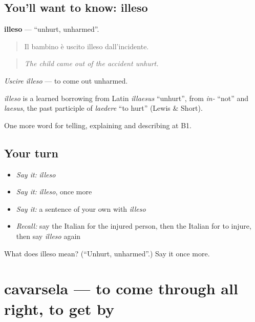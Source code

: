 \subsection*{You'll want to know: illeso}
\textbf{illeso} — \textquotedblleft{}unhurt, unharmed\textquotedblright{}.

\begin{quote}
Il bambino è uscito illeso dall'incidente.
\end{quote}

\begin{quote}
\emph{The child came out of the accident unhurt.}
\end{quote}

\emph{Uscire illeso} — to come out unharmed.

\begin{cousinweb}
\emph{illeso} is a learned borrowing from Latin \emph{illaesus} \textquotedblleft{}unhurt\textquotedblright{}, from \emph{in-} \textquotedblleft{}not\textquotedblright{} and \emph{laesus}, the past participle of \emph{laedere} \textquotedblleft{}to hurt\textquotedblright{} (Lewis \& Short).
\end{cousinweb}

\begin{grammarlens}[title={What you've built}]
One more word for telling, explaining and describing at B1.
\end{grammarlens}

\subsection*{Your turn}
\begin{itemize}
\raggedright
  \item \emph{Say it:} \emph{illeso}
  \item \emph{Say it:} \emph{illeso}, once more
  \item \emph{Say it:} a sentence of your own with \emph{illeso}
  \item \emph{Recall:} say the Italian for the injured person, then the Italian for to injure, then say \emph{illeso} again
\end{itemize}

\begin{tcolorbox}[breakable,colback=teal!4,colframe=teal!35!black,title={Before you move on}]
What does illeso mean? (\textquotedblleft{}Unhurt, unharmed\textquotedblright{}.) Say it once more.
\end{tcolorbox}
\section[cavarsela]{cavarsela — to come through all right, to get by}

